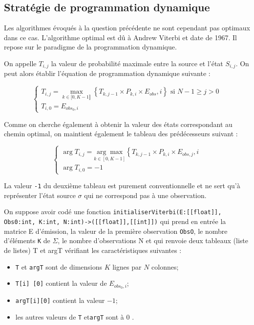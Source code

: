 \subsection{Stratégie de programmation dynamique}


Les algorithmes évoqués à la question précédente ne sont cependant pas optimaux dans ce cas. L'algorithme optimal est dû à Andrew Viterbi et date de 1967. Il repose sur le paradigme de la programmation dynamique.

On appelle $T_{i, j}$ la valeur de probabilité maximale entre la source et l'état $S_{i, j}$. On peut alors établir l'équation de programmation dynamique suivante :

$$
\left\{\begin{array}{l}
T_{i, j}=\max _{k \in[0, K-1 \rrbracket}\left\{T_{k, j-1} \times P_{k, i} \times E_{o b s}, i\right\} \text{ si } N-1 \geq j > 0  \\
T_{i, 0}=E_{o b s_{0}, i}
\end{array}\right.
$$

Comme on cherche également à obtenir la valeur des états correspondant au chemin optimal, on maintient également le tableau des prédécesseurs suivant :

$$
\left\{\begin{array}{l}
\arg T_{i, j}=\underset{k \in[0, K-1]}{\arg \max }\left\{T_{k, j-1} \times P_{k, i} \times E_{o b s, j}, i\right. \\
\arg T_{i, 0}=-1
\end{array}\right.
$$

La valeur \lstinline{-1} du deuxième tableau est purement conventionnelle et ne sert qu'à représenter l'état source $\sigma$ qui ne correspond pas à une observation.

On suppose avoir codé une fonction \lstinline{initialiserViterbi(E:[[float]], Obs0:int, K:int, N:int)->([[float]],[[int]])} qui prend en entrée la matrice E d'émission, la valeur de la première observation \lstinline{ObsO}, le nombre d'éléments \lstinline{K} de $\Sigma$, le nombre d'observations N et qui renvoie deux tableaux (liste de listes) T et argT vérifiant les caractéristiques suivantes :

\begin{itemize}
  \item \lstinline{T} et \lstinline{argT} sont de dimensions $K$ lignes par $N$ colonnes;
  \item \lstinline{T[i] [0]} contient la valeur de $E_{o b s_{0}, i}$;
  \item \lstinline{argT[i][0]} contient la valeur $-1$;
  \item les autres valeurs de \lstinline{T} et\lstinline{argT} sont à 0 .
\end{itemize}

